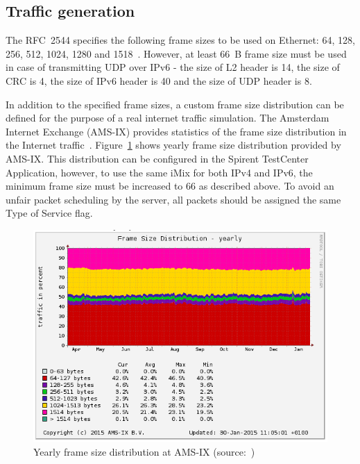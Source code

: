 
\subsection{Traffic generation}
The RFC~2544 specifies the following frame sizes to be used on Ethernet:
64, 128, 256, 512, 1024, 1280 and 1518~\cite{rfc2544}.
However, at least 66~B frame size must be used in case of transmitting UDP over IPv6 - the size of L2 header is 14,
the size of CRC is 4, the size of IPv6 header is 40 and the size of UDP header is 8.

In addition to the specified frame sizes, a custom frame size distribution can be defined for the purpose of
a real internet traffic simulation.
The Amsterdam Internet Exchange (AMS-IX) provides
statistics of the frame size distribution in the Internet traffic~\cite{amsix-frame-size}.
Figure~\ref{fig:analysis-amsix-frame-size} shows yearly frame size distribution provided by AMS-IX.
This distribution can be configured in the Spirent TestCenter Application, however,
to use the same iMix for both IPv4 and IPv6, the minimum frame size must be increased to 66 as described above.
To avoid an unfair packet scheduling by the server, all packets should be assigned the same Type of Service flag.

\begin{figure}
	\centering
	\includegraphics[width=14.5cm,keepaspectratio]{fig/amsix.png}
	\caption{Yearly frame size distribution at AMS-IX (source:~\cite{amsix-frame-size})}
	\label{fig:analysis-amsix-frame-size}
\end{figure}
